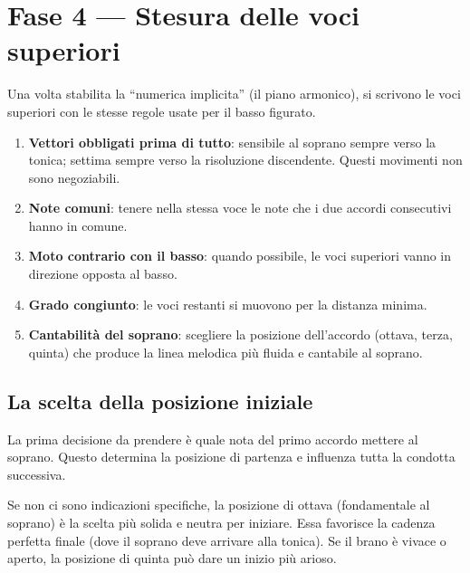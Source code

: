 \section{Fase 4 — Stesura delle voci superiori}
\label{sec:fase4_basso}

Una volta stabilita la ``numerica implicita'' (il piano armonico), si scrivono le voci superiori con le stesse regole usate per il basso figurato.

\begin{regola}
	\label{reg:priorita_stesura}
	\begin{enumerate}
		\item \textbf{Vettori obbligati prima di tutto}: sensibile al soprano sempre verso la tonica; settima sempre verso la risoluzione discendente. Questi movimenti non sono negoziabili.
		\item \textbf{Note comuni}: tenere nella stessa voce le note che i due accordi consecutivi hanno in comune.
		\item \textbf{Moto contrario con il basso}: quando possibile, le voci superiori vanno in direzione opposta al basso.
		\item \textbf{Grado congiunto}: le voci restanti si muovono per la distanza minima.
		\item \textbf{Cantabilità del soprano}: scegliere la posizione dell'accordo (ottava, terza, quinta) che produce la linea melodica più fluida e cantabile al soprano.
	\end{enumerate}
\end{regola}

\subsection{La scelta della posizione iniziale}

La prima decisione da prendere è quale nota del primo accordo mettere al soprano. Questo determina la posizione di partenza e influenza tutta la condotta successiva.

\begin{regola}
	\label{reg:posizione_iniziale}
	Se non ci sono indicazioni specifiche, la posizione di ottava (fondamentale al soprano) è la scelta più solida e neutra per iniziare. Essa favorisce la cadenza perfetta finale (dove il soprano deve arrivare alla tonica). Se il brano è vivace o aperto, la posizione di quinta può dare un inizio più arioso.
\end{regola}

